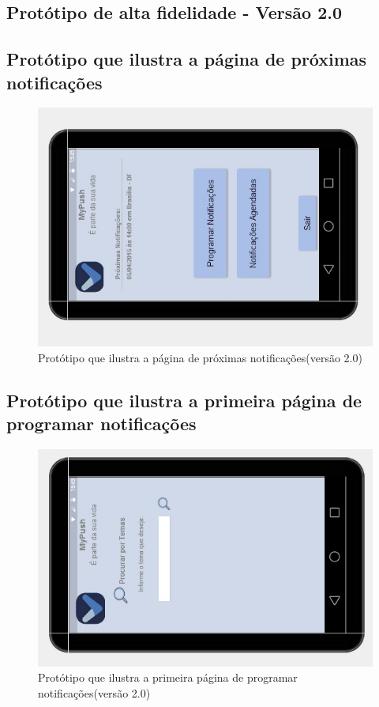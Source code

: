 \begin{apendicesenv}
\chapter{Protótipo de alta fidelidade - Versão 2.0}


    \section*{Protótipo que ilustra a página de próximas notificações}

    \begin{figure}[!htbp]
      \centering
      \includegraphics[scale=0.5, angle=-90]{editaveis/figuras/prototipo_alta_fidelidade_v2/2_1}
      \caption{Protótipo que ilustra a página de próximas notificações(versão 2.0)}
      \label{v2}
    \end{figure}
    
      \section*{Protótipo que ilustra a primeira página de programar notificações}

    \begin{figure}[!htbp]
      \centering
      \includegraphics[scale=0.5, angle=-90]{editaveis/figuras/prototipo_alta_fidelidade_v2/2_2}
      \caption{Protótipo que ilustra a primeira página de programar notificações(versão 2.0)}
      \label{v2}
    \end{figure}
    

\end{apendicesenv}
